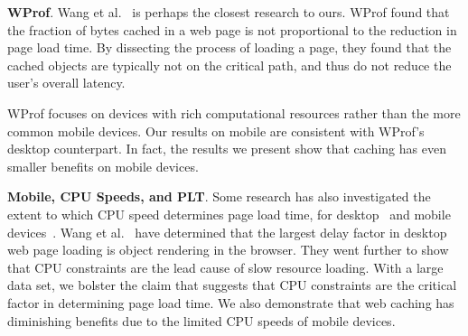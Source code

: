 \textbf{WProf}. Wang et al.~\cite{wang2013demystifying} is perhaps the closest research to ours. WProf found that the fraction of bytes cached in a web page is not proportional to the reduction in page load time. By dissecting the process of loading a page, they found that the cached objects are typically not on the critical path, and thus do not reduce the user's overall latency. 

WProf focuses on devices with rich computational resources rather than the more common mobile devices. Our results on mobile are consistent with WProf's desktop counterpart. In fact, the results we present show that caching has even smaller benefits on mobile devices.

\textbf{Mobile, CPU Speeds, and PLT}.
Some research has also investigated the extent to which CPU speed determines page load time, for desktop~\cite{CPU-plt-1} and mobile devices~\cite{CPU-plt-2, CPU-plt-3}.
Wang et al.~\cite{CPU-plt-2, CPU-plt-3} have determined that the largest delay factor in desktop web page loading is object rendering in the browser. They went further to show that CPU constraints are the lead cause of slow resource loading. 
With a large data set, we bolster the claim that suggests that CPU constraints are the critical factor in determining page load time. We also demonstrate that web caching has diminishing benefits due to the limited CPU speeds of mobile devices.
